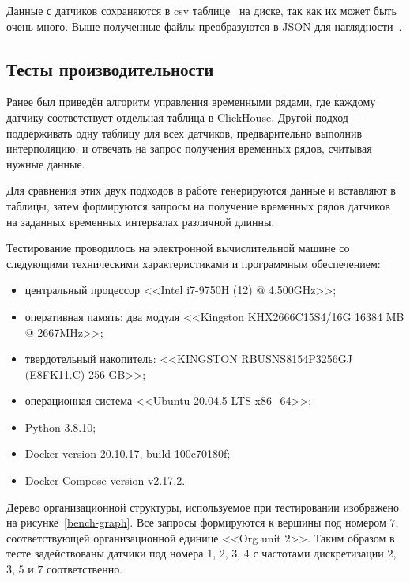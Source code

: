 Данные с датчиков сохраняются в csv таблице~\cite{Python-csv} на диске, так как их может быть очень много. Выше полученные файлы преобразуются в JSON для наглядности~\cite{file-response}.

\subsection{Тесты производительности}

Ранее был приведён алгоритм управления временными рядами, где каждому датчику соответствует отдельная таблица в ClickHouse. Другой подход --- поддерживать одну таблицу для всех датчиков, предварительно выполнив интерполяцию, и отвечать на запрос получения временных рядов, считывая нужные данные.

Для сравнения этих двух подходов в работе генерируются данные и вставляют в таблицы, затем формируются запросы на получение временных рядов датчиков на заданных временных интервалах различной длинны.

Тестирование проводилось на электронной вычислительной машине со следующими техническими характеристиками и программным обеспечением:

\begin{itemize}
    \item центральный процессор <<Intel i7-9750H (12) @ 4.500GHz>>;
    \item оперативная память: два модуля <<Kingston KHX2666C15S4/16G 16384 MB @ 2667MHz>>;
    \item твердотельный накопитель: <<KINGSTON RBUSNS8154P3256GJ (E8FK11.C) 256 GB>>;
    \item операционная система <<Ubuntu 20.04.5 LTS x86\_64>>;
    \item Python 3.8.10;
    \item Docker version 20.10.17, build 100c70180f;
    \item Docker Compose version v2.17.2.
\end{itemize}

Дерево организационной структуры, используемое при тестировании изображено на рисунке~\ref{bench-graph}. Все запросы формируются к вершины под номером $7$, соответствующей организационной единице <<Org unit $2$>>. Таким образом в тесте задействованы датчики под номера $1$, $2$, $3$, $4$ с частотами дискретизации $2$, $3$, $5$ и $7$ соответственно.

